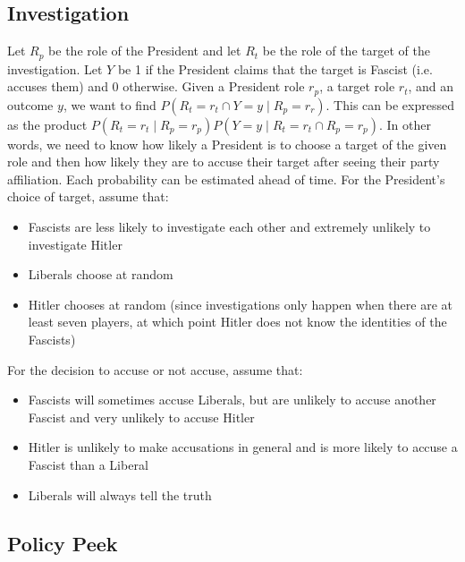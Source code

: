 \documentclass[fleqn, 12pt, letterpaper]{article}
\begin{document}
\subsection{Investigation}
Let $R_p$ be the role of the President and let $R_t$ be the role of the target of the investigation. Let $Y$ be 1 if the President claims that the target is Fascist (i.e. accuses them) and 0 otherwise. Given a President role $r_p$, a target role $r_t$, and an outcome $y$, we want to find $P(R_t=r_t \cap Y=y \mid R_p=r_r)$. This can be expressed as the product $P(R_t=r_t \mid R_p=r_p) P(Y=y \mid R_t=r_t \cap R_p=r_p)$. In other words, we need to know how likely a President is to choose a target of the given role and then how likely they are to accuse their target after seeing their party affiliation. Each probability can be estimated ahead of time. For the President's choice of target, assume that:
\begin{itemize}
	\item Fascists are less likely to investigate each other and extremely unlikely to investigate Hitler
	\item Liberals choose at random
	\item Hitler chooses at random (since investigations only happen when there are at least seven players, at which point Hitler does not know the identities of the Fascists)
\end{itemize}
For the decision to accuse or not accuse, assume that:
\begin{itemize}
	\item Fascists will sometimes accuse Liberals, but are unlikely to accuse another Fascist and very unlikely to accuse Hitler
	\item Hitler is unlikely to make accusations in general and is more likely to accuse a Fascist than a Liberal
	\item Liberals will always tell the truth
\end{itemize}

\newpage
\subsection{Policy Peek}
\end{document}
